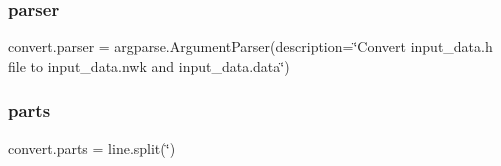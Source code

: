 \mbox{\label{namespaceconvert_af8535903aa99b7698550743368e65b24}} 
\subsubsection{\texorpdfstring{parser}{parser}}
{\footnotesize\ttfamily convert.\+parser = argparse.\+Argument\+Parser(description=\char`\"{}Convert input\+\_\+data.\+h file to input\+\_\+data.\+nwk and input\+\_\+data.\+data\char`\"{})}

\mbox{\label{namespaceconvert_a503fc94db74d6869d7c38721a1f90657}} 
\subsubsection{\texorpdfstring{parts}{parts}}
{\footnotesize\ttfamily convert.\+parts = line.\+split(\textquotesingle{}\char`\"{}\textquotesingle{})}

